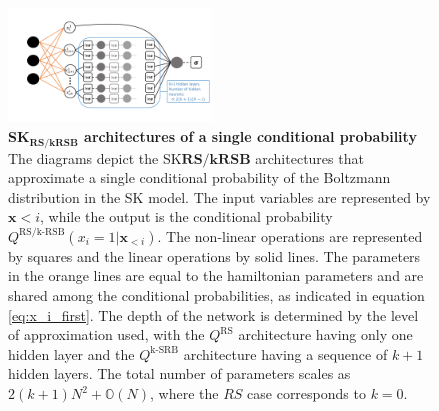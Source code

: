 \documentclass[aps,physrev,10pt,floatfix,reprint]{revtex4-2}
\begin{document}
\begin{figure}[!h]
    \centering 
    \includegraphics[width=0.48\textwidth]{img/SK_arch.pdf}
    \caption{\textbf{SK$\mathbf{_{RS/kRSB}}$ architectures of a single conditional probability} The diagrams depict the SK$\mathbf{{RS/kRSB}}$ architectures that approximate a single conditional probability of the Boltzmann distribution in the SK model. The input variables are represented by $\mathbf{x}{<i}$, while the output is the conditional probability $Q^{\text{RS/k-RSB}}\left(x_{i}=1|\mathbf{x}_{<i}\right)$. The non-linear operations are represented by squares and the linear operations by solid lines. The parameters in the orange lines are equal to the hamiltonian parameters and are shared among the conditional probabilities, as indicated in equation \ref{eq:x_i_first}. The depth of the network is determined by the level of approximation used, with the $Q^{\text{RS}}$ architecture having only one hidden layer and the $Q^{\text{k-SRB}}$ architecture having a sequence of $k+1$ hidden layers. The total number of parameters scales as $2(k+1)N^2 + \mathbb{O}(N)$, where the $RS$ case corresponds to $k=0$.}
    \label{fig:SK_arch}
\end{figure}
\end{document}
